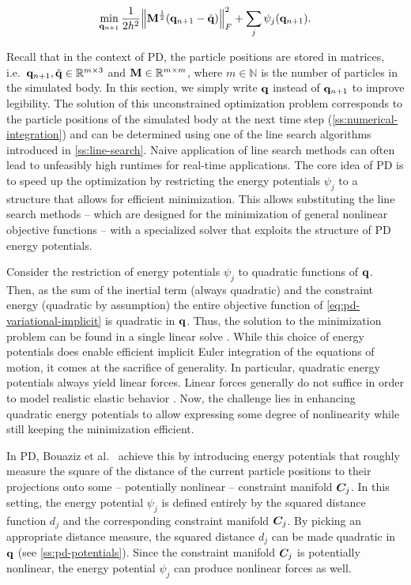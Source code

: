\begin{equation}\label{eq:pd-variational-implicit}
    \min_{\mathbf{q}_{n+1}} \frac{1}{2h^2} \norm{\mathbf{M}^{\frac{1}{2}}(\mathbf{q}_{n+1} - \tilde{\mathbf{q}})}^2_F + \sum_j \psi_j(\mathbf{q}_{n+1}).
\end{equation}

\noindent Recall that in the context of PD, the particle positions are stored in matrices, i.e.\ $\mathbf{q}_{n+1}, \tilde{\mathbf{q}} \in 
\mathbb{R}^{m \times 3}$ and $\mathbf{M} \in \mathbb{R}^{m \times m}$, where $m \in \mathbb{N}$ is the number of particles in the simulated
body. In this section, we simply write $\mathbf{q}$ instead of $\mathbf{q}_{n+1}$ to improve legibility. The solution of this unconstrained 
optimization problem corresponds to the particle positions of the simulated body at the next time
step (\cref{ss:numerical-integration}) and can be determined using one of the line search algorithms introduced in \cref{ss:line-search}.
Naive application of line search methods can often lead to unfeasibly high runtimes for real-time applications. The core idea of PD
is to speed up the optimization by restricting the energy potentials $\psi_j$ to a structure that allows for efficient minimization.
This allows substituting the line search methods -- which are designed for the minimization of general nonlinear objective functions 
-- with a specialized solver that exploits the structure of PD energy potentials. 

Consider the restriction of energy potentials $\psi_j$ to quadratic functions of $\mathbf{q}$. Then, as the sum of the inertial term 
(always quadratic) and the constraint energy (quadratic by assumption) the entire objective function of \autoref{eq:pd-variational-implicit} 
is quadratic in $\mathbf{q}$. Thus, the solution to the minimization problem can be found in a single linear solve \cite{nocedal2006}. 
While this choice
of energy potentials does enable efficient implicit Euler integration of the equations of motion, it comes at the sacrifice of generality.
In particular, quadratic energy potentials always yield linear forces. Linear forces generally do not suffice in order to model realistic
elastic behavior \cite{wang2011}. Now, the challenge lies in enhancing quadratic energy potentials to allow expressing some degree
of nonlinearity while still keeping the minimization efficient. 

In PD, Bouaziz et al.\ \cite{bouaziz2014} achieve this by introducing energy potentials that roughly measure the square of the
distance of the current particle positions to their projections onto some -- potentially nonlinear -- constraint manifold $\bm{C}_j$. 
In this setting, the energy potential $\psi_j$ is defined entirely by the squared distance function $d_j$ and the corresponding constraint 
manifold $\bm{C}_j$. By picking an appropriate distance measure, the squared distance $d_j$ can be made quadratic in $\mathbf{q}$ 
(see \cref{ss:pd-potentials}). Since the constraint manifold $\bm{C}_j$ is potentially nonlinear, the energy potential 
$\psi_j$ can produce nonlinear forces as well. 

